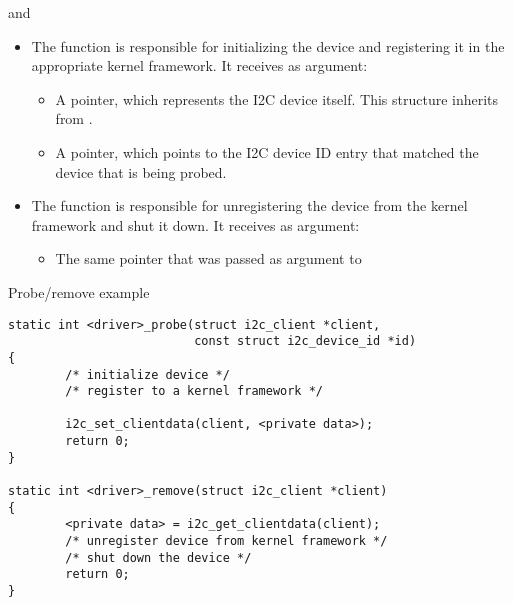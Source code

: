 \begin{frame}{ and }

  \begin{itemize}
  \item The  function is responsible for initializing
    the device and registering it in the appropriate kernel
    framework. It receives as argument:
    \begin{itemize}
    \item A  pointer, which represents the I2C
      device itself. This structure inherits from .
    \item A  pointer, which points to the
      I2C device ID entry that matched the device that is being
      probed.
    \end{itemize}
  \item The  function is responsible for
    unregistering the device from the kernel framework and shut it
    down. It receives as argument:
    \begin{itemize}
    \item The same  pointer that was passed as
      argument to 
    \end{itemize}
  \end{itemize}
\end{frame}

\begin{frame}[fragile]{Probe/remove example}
  \begin{block}{}
    \begin{verbatim}
static int <driver>_probe(struct i2c_client *client,
                          const struct i2c_device_id *id)
{
        /* initialize device */
        /* register to a kernel framework */

        i2c_set_clientdata(client, <private data>);
        return 0;
}

static int <driver>_remove(struct i2c_client *client)
{
        <private data> = i2c_get_clientdata(client);
        /* unregister device from kernel framework */
        /* shut down the device */
        return 0;
}
    \end{verbatim}
  \end{block}
\end{frame}

